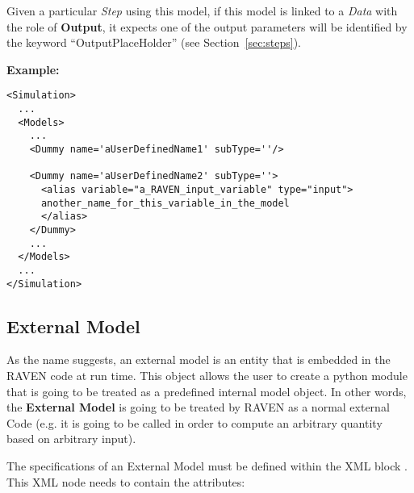 Given a particular \textit{Step} using this model, if this model is linked to
a \textit{Data} with the role of \textbf{Output}, it expects one of the output
parameters will be identified by the keyword ``OutputPlaceHolder'' (see
Section~\ref{sec:steps}).

\textbf{Example:}
\begin{lstlisting}[style=XML,morekeywords={subType}]
<Simulation>
  ...
  <Models>
    ...
    <Dummy name='aUserDefinedName1' subType=''/>

    <Dummy name='aUserDefinedName2' subType=''>
      <alias variable="a_RAVEN_input_variable" type="input">
      another_name_for_this_variable_in_the_model
      </alias>
    </Dummy>
    ...
  </Models>
  ...
</Simulation>
\end{lstlisting}






\subsection{External Model}
\label{subsec:models_externalModel}
As the name suggests, an external model is an entity that is embedded in the
RAVEN code at run time.
%
This object allows the user to create a python module that is going to be
treated as a predefined internal model object.
%
In other words, the \textbf{External Model} is going to be treated by RAVEN as a
normal external Code (e.g. it is going to be called in order to compute an
arbitrary quantity based on arbitrary input).
%

The specifications of an External Model must be defined within the XML block
.
%
This XML node needs to contain the attributes:

